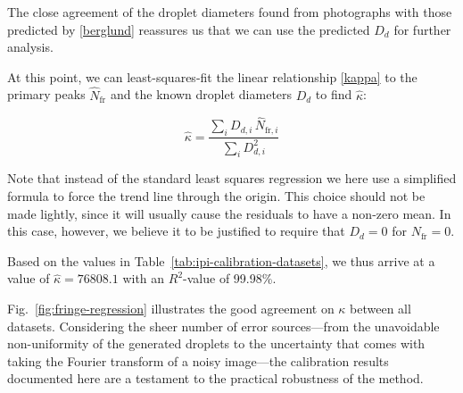 \documentclass[11.5pt,oneside]{book}
\newcommand*{\figref}[1]{Fig.~\ref{#1}}
\newcommand*{\tableref}[1]{Table~\ref{#1}}
\begin{document}
The close agreement of the droplet diameters found from photographs with those
predicted by \eqref{berglund} reassures us that we can use the predicted $D_d$
for further analysis.

At this point, we can least-squares-fit the linear relationship \eqref{kappa} to the primary
peaks $\hat{N}_\text{fr}$ and the known droplet diameters $D_d$ to find
$\hat{\kappa}$:

\begin{equation}
    \hat{\kappa} = \frac{\sum_i D_{d,i} \, \hat{N}_{\text{fr}, i}}{\sum_i
    D_{d,i}^2}
\end{equation}

Note that instead of the standard least squares regression we here use a
simplified formula to force the trend line through the origin. This choice
should not be made lightly, since it will usually cause the residuals to have a
non-zero mean. In this case, however, we believe it to be justified to require
that $D_d = 0$ for $N_\text{fr} = 0$.

Based on the values in \tableref{tab:ipi-calibration-datasets}, we thus arrive
at a value of $\hat{\kappa} = 76808.1$ with an $R^2$-value of 99.98\%. 

\figref{fig:fringe-regression} illustrates the good agreement on $\kappa$ between
all datasets. Considering the sheer number of error sources---from the
unavoidable non-uniformity of the generated droplets to the uncertainty that
comes with taking the Fourier transform of a noisy image---the calibration
results documented here are a testament to the practical robustness of the
method.
\end{document}
